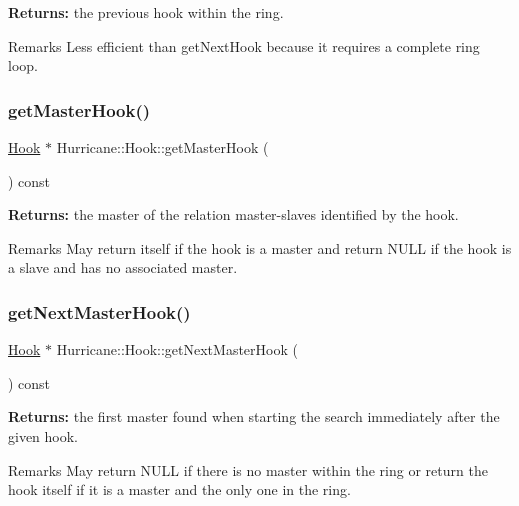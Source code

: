 {\bfseries Returns\+:} the previous hook within the ring.

\begin{DoxyRemark}{Remarks}
Less efficient than get\+Next\+Hook because it requires a complete ring loop. 
\end{DoxyRemark}
\mbox{\label{classHurricane_1_1Hook_af18e0531df4ed14b64cf058b780aee46}} 
\subsubsection{\texorpdfstring{get\+Master\+Hook()}{getMasterHook()}}
{\footnotesize\ttfamily \mbox{\hyperlink{classHurricane_1_1Hook}{Hook}} $\ast$ Hurricane\+::\+Hook\+::get\+Master\+Hook (\begin{DoxyParamCaption}{ }\end{DoxyParamCaption}) const}

{\bfseries Returns\+:} the master of the relation master-\/slaves identified by the hook.

\begin{DoxyRemark}{Remarks}
May return itself if the hook is a master and return N\+U\+LL if the hook is a slave and has no associated master. 
\end{DoxyRemark}
\mbox{\label{classHurricane_1_1Hook_a0923a5a2d0a7ee0458876eed72008e46}} 
\subsubsection{\texorpdfstring{get\+Next\+Master\+Hook()}{getNextMasterHook()}}
{\footnotesize\ttfamily \mbox{\hyperlink{classHurricane_1_1Hook}{Hook}} $\ast$ Hurricane\+::\+Hook\+::get\+Next\+Master\+Hook (\begin{DoxyParamCaption}{ }\end{DoxyParamCaption}) const}

{\bfseries Returns\+:} the first master found when starting the search immediately after the given hook.

\begin{DoxyRemark}{Remarks}
May return N\+U\+LL if there is no master within the ring or return the hook itself if it is a master and the only one in the ring. 
\end{DoxyRemark}
\mbox{\label{classHurricane_1_1Hook_a80bf5cdd4e81952064f1be94fe10188f}} 
